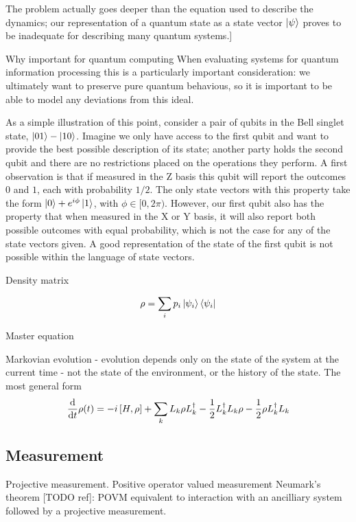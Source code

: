   The problem actually goes deeper than the equation used to describe the dynamics; our representation of a quantum state as a state vector $\left\vert\psi\right\rangle$ proves to be inadequate for describing many quantum systems.]

Why important for quantum computing
When evaluating systems for quantum information processing this is a particularly important consideration: we ultimately want to preserve pure quantum behavious, so it is important to be able to model any deviations from this ideal.

As a simple illustration of this point, consider a pair of qubits in the Bell singlet state, $\left\vert01\right\rangle - \left\vert10\right\rangle$. Imagine we only have access to the first qubit and want to provide the best possible description of its state; another party holds the second qubit and there are no restrictions placed on the operations they perform. A first observation is that if measured in the Z basis this qubit will report the outcomes $0$ and $1$, each with probability $1/2$. The only state vectors with this property take the form $\left\vert0\right\rangle + e^{i\phi}\left\vert1\right\rangle$, with $\phi \in [0, 2\pi)$. However, our first qubit also has the property that when measured in the X or Y basis, it will also report both possible outcomes with equal probability, which is not the case for any of the state vectors given. A good representation of the state of the first qubit is not possible within the language of state vectors.

Density matrix

\begin{align}
  \rho = \sum_i p_i \left\vert\psi_i\right\rangle\left\langle \psi_i\right\vert 
\end{align}

Master equation

Markovian evolution - evolution depends only on the state of the system at the current time - not the state of the environment, or the history of the state. The most general form \cite{lindblad}
\begin{align}\label{master_eq}
  \frac{\mathrm{d}}{\mathrm{d}t} \rho(t) = -i \left[H, \rho\right] + \sum_k L_k \rho L_k^\dagger -\frac{1}{2} L_k^\dagger L_k \rho -\frac{1}{2} \rho L_k^\dagger L_k 
\end{align}


\subsection{Measurement}



Projective measurement. Positive operator valued measurement
Neumark's theorem [TODO ref]: POVM equivalent to interaction with an ancilliary system followed by a projective measurement.

